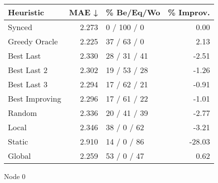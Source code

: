 \begin{tabular}{lrlr}
\toprule
\textbf{Heuristic} & \textbf{MAE ↓} & \textbf{\% Be/Eq/Wo} & \textbf{\% Improv.} \\
\midrule
            Synced &          2.273 &          0 / 100 / 0 &                0.00 \\
     Greedy Oracle &          2.225 &          37 / 63 / 0 &                2.13 \\
         Best Last &          2.330 &         28 / 31 / 41 &               -2.51 \\
       Best Last 2 &          2.302 &         19 / 53 / 28 &               -1.26 \\
       Best Last 3 &          2.294 &         17 / 62 / 21 &               -0.91 \\
    Best Improving &          2.296 &         17 / 61 / 22 &               -1.01 \\
            Random &          2.336 &         20 / 41 / 39 &               -2.77 \\
             Local &          2.346 &          38 / 0 / 62 &               -3.21 \\
            Static &          2.910 &          14 / 0 / 86 &              -28.03 \\
            Global &          2.259 &          53 / 0 / 47 &                0.62 \\
\bottomrule
\end{tabular}
\caption{Node 0}
\label{tab:hr_iid_lr05_le1_bs4_0}
